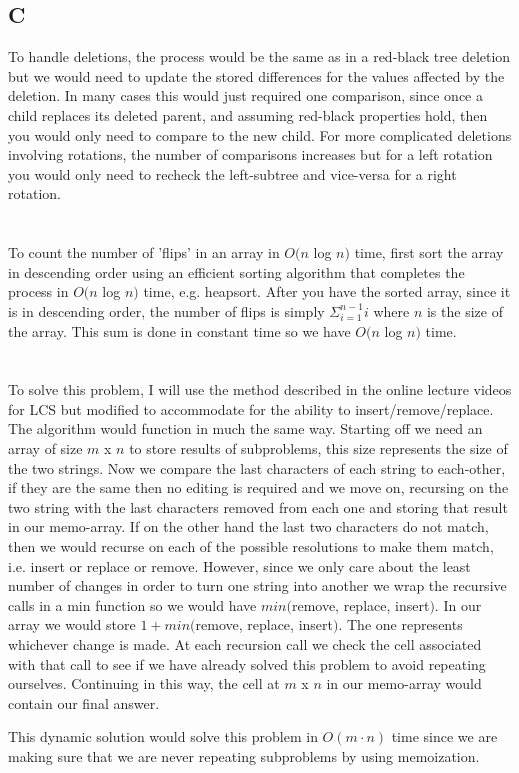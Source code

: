 \documentclass[12pt]{article}
\begin{document}
\subsection{C}

To handle deletions, the process would be the same as in a red-black tree deletion but we would need to update the stored differences for the values affected by the deletion. In many cases this would just required one comparison, since once a child replaces its deleted parent, and assuming red-black properties hold, then you would only need to compare to the new child. For more complicated deletions involving rotations, the number of comparisons increases but for a left rotation you would only need to recheck the left-subtree and vice-versa for a right rotation.

\pagebreak

\section{}

To count the number of 'flips' in an array in $O(n$ log $ n)$ time, first sort the array in descending order using an efficient sorting algorithm that completes the process in $O(n$ log $ n)$ time, e.g. heapsort. After you have the sorted array, since it is in descending order, the number of flips is simply $\Sigma_{i=1}^{n-1} i$ where $n$ is the size of the array. This sum is done in constant time so we have $O(n$ log $ n)$ time.

\pagebreak

\section{}

To solve this problem, I will use the method described in the online lecture videos for LCS but modified to accommodate for the ability to insert/remove/replace. The algorithm would function in much the same way. Starting off we need an array of size $m$ x $n$ to store results of subproblems, this size represents the size of the two strings. Now we compare the last characters of each string to each-other, if they are the same then no editing is required and we move on, recursing on the two string with the last characters removed from each one and storing that result in our memo-array. If on the other hand the last two characters do not match, then we would recurse on each of the possible resolutions to make them match, i.e. insert or replace or remove. However, since we only care about the least number of changes in order to turn one string into another we wrap the recursive calls in a min function so we would have $min($remove, replace, insert$)$. In our array we would store $1+min($remove, replace, insert$)$. The one represents whichever change is made. At each recursion call we check the cell associated with that call to see if we have already solved this problem to avoid repeating ourselves. Continuing in this way, the cell at $m$ x $n$ in our memo-array would contain our final answer.

This dynamic solution would solve this problem in $O(m\cdot n)$ time since we are making sure that we are never repeating subproblems by using memoization.
\end{document}
